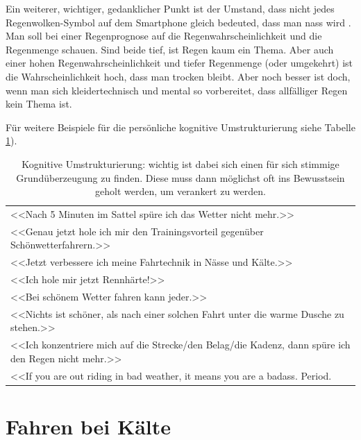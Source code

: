 Ein weiterer, wichtiger, gedanklicher Punkt ist der Umstand, dass nicht jedes Regenwolken-Symbol
auf dem Smartphone gleich bedeuted, dass man nass wird \cite{srf2016regenpoker}.
Man soll bei einer Regenprognose auf die Regenwahrscheinlichkeit und die Regenmenge schauen.
Sind beide tief, ist Regen kaum ein Thema. Aber auch einer hohen Regenwahrscheinlichkeit und
tiefer Regenmenge (oder umgekehrt) ist die Wahrscheinlichkeit hoch, dass man trocken bleibt.
Aber noch besser ist doch, wenn man sich kleidertechnisch und mental so vorbereitet,
dass allfälliger Regen kein Thema ist.

Für weitere Beispiele für die persönliche kognitive Umstrukturierung
siehe Tabelle \ref{tab:kognitiveumstrukturierung}).

\begin{table}
        \centering
        \begin{tabular}{l}
                \toprule
        <<Nach 5 Minuten im Sattel spüre ich das Wetter nicht mehr.>>\\
        <<Genau jetzt hole ich mir den Trainingsvorteil gegenüber Schönwetterfahrern.>>\\
        <<Jetzt verbessere ich meine Fahrtechnik in Nässe und Kälte.>>\\
        <<Ich hole mir jetzt Rennhärte!>>\\
        <<Bei schönem Wetter fahren kann jeder.>>\\
        <<Nichts ist schöner, als nach einer solchen Fahrt unter die warme Dusche zu stehen.>>\\
        <<Ich konzentriere mich auf die Strecke/den Belag/die Kadenz, dann spüre ich den Regen nicht mehr.>>\\
        <<If you are out riding in bad weather, it means you are a badass. Period. \cite[Rule \#9]{velominati2014rules}\\
                \bottomrule
        \end{tabular}
        \caption{Kognitive Umstrukturierung: wichtig ist dabei sich einen für sich stimmige Grundüberzeugung zu finden.
        Diese muss dann möglichst oft ins Bewusstsein geholt werden, um verankert zu werden.}
        \label{tab:kognitiveumstrukturierung}
\end{table}

\section{Fahren bei Kälte}

